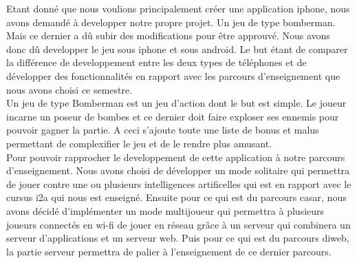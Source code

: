 
 Etant donné que nous voulions principalement créer une application
 \gls{iphone}, nous avons demandé à developper notre propre projet. Un jeu de
 type bomberman. Mais ce dernier a dû subir des modifications pour être
 approuvé. Nous avons donc dû developper le jeu sous \gls{iphone} et sous
 \gls{android}. Le but étant de comparer la différence de developpement entre
 les deux types de téléphones et de développer des fonctionnalités en rapport
 avec les parcours d'enseignement que nous avons choisi ce semestre.\\
	
Un jeu de type Bomberman est un jeu d'action dont le but est simple. Le joueur
incarne un poseur de bombes et ce dernier doit faire exploser ses ennemis pour
pouvoir gagner la partie. A ceci s'ajoute toute une liste de bonus et malus
permettant de complexifier le jeu et de le rendre plus amusant.\\
	
Pour pouvoir rapprocher le developpement de cette application à notre parcours
d'enseignement. Nous avons choisi de développer un mode solitaire qui permettra
de jouer contre une ou plusieurs intelligences artificelles qui est en rapport
avec le cursus \gls{i2a} qui nous est enseigné. Ensuite pour ce qui est du
parcours \gls{casar}, nous avons décidé d'implémenter un mode multijoueur qui
permettra à plusieurs joueurs connectés en \gls{wi-fi} de jouer en réseau grâce
à un serveur qui combinera un serveur d'applications et un serveur web. Puis
pour ce qui est du parcours \gls{diweb}, la partie serveur permettra de palier à
l'enseignement de ce dernier parcours.
	
